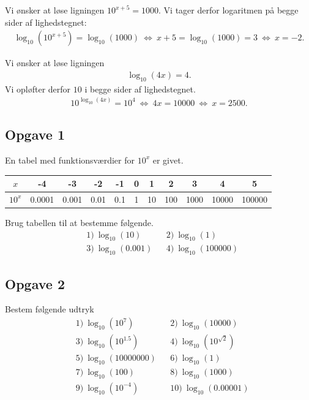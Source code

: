 \begin{exa}
	Vi ønsker at løse ligningen $10^{x+5} = 1000$. Vi tager derfor logaritmen på begge sider af lighedstegnet:
	\begin{align*}
		\log_{10}\left(10^{x+5}\right) = \log_{10}(1000) \ \Leftrightarrow \ x+5 = \log_{10}(1000) = 3 \ \Leftrightarrow	\ x = -2.
	\end{align*}	 
\end{exa}
\begin{exa}
	Vi ønsker at løse ligningen 
	\begin{align*}
		\log_{10}(4x) = 4. 
	\end{align*}
	Vi opløfter derfor $10$ i begge sider af lighedstegnet.
	\begin{align*}
		10^{\log_{10}(4x)} = 10^4 \ \Leftrightarrow \ 4x = 10000 \ \Leftrightarrow	\ x = 2500.
	\end{align*}
\end{exa}

\subsection*{Opgave 1}
En tabel med funktionsværdier for $10^x$ er givet.
\begin{table}[H]
	\centering
	\begin{tabular}{c|c|c|c|c|c|c|c|c|c|c}
		$x$ & -4 & -3 & -2 & -1 & 0 & 1 & 2 & 3 & 4 & 5 \\
		\hline
		$10^x$ & 0.0001 & 0.001 & 0.01& 0.1 & 1 & 10 & 100 & 1000 & 10000 & 100000
	\end{tabular}
\end{table}
Brug tabellen til at bestemme følgende.
\begin{align*}
	&1) \ \log_{10}(10)     &&2) \ \log_{10}(1)    \\
	&3) \ \log_{10}(0.001)     &&4) \  \log_{10}(100000)   
\end{align*}


\subsection*{Opgave 2}
Bestem følgende udtryk 
\begin{align*}
	&1) \ \log_{10}(10^7)    &&2) \ \log_{10}(10000)   \\  
	&3) \ \log_{10}(10^{1.5})   &&4) \ \log_{10}(10^{\sqrt{2}})     \\  
	&5) \ \log_{10}(10000000)   &&6) \ \log_{10}(1)   \\  
	&7) \ \log_{10}(100)			&&8) \ \log_{10}(1000)  \\
	&9) \ \log_{10}(10^{-4})     &&10) \ \log_{10}(0.00001) \\ 
\end{align*}

